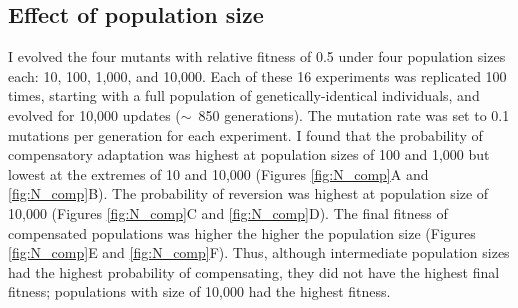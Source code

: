 \begin{doublespace}
\subsection{Effect of population size}

I evolved the four mutants with relative fitness of 0.5
under four population sizes each: 10, 100, 1,000, and 10,000.
%
Each of these 16 experiments was replicated 100 times,
starting with a full population of genetically-identical individuals,
and evolved for 10,000 updates ($\sim$~850 generations).
%
The mutation rate was set to 0.1 mutations per generation for each experiment.
%
I found that the probability of compensatory adaptation
was highest at population sizes of 100 and 1,000
but lowest at the extremes of 10 and 10,000
(Figures \ref{fig:N_comp}A and \ref{fig:N_comp}B).
%
The probability of reversion was highest at population size of 10,000
(Figures \ref{fig:N_comp}C and \ref{fig:N_comp}D).
%
The final fitness of compensated populations
was higher the higher the population size
(Figures \ref{fig:N_comp}E and \ref{fig:N_comp}F).
%
Thus, although intermediate population sizes
had the highest probability of compensating,
they did not have the highest final fitness;
populations with size of 10,000 had the highest fitness.




\end{doublespace}
